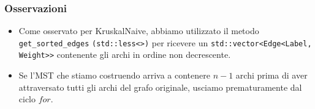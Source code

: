 \subsubsection{Osservazioni}
\begin{itemize}
    \item Come osservato per KruskalNaive, abbiamo utilizzato il metodo  \texttt{get_sorted_edges} \texttt{(std::less<>{})} per ricevere un \texttt{std::vector<Edge<Label, Weight>>} contenente gli archi in ordine non decrescente. \\

    \item Se l'MST che stiamo costruendo arriva a contenere $n - 1$ archi prima di aver attraversato tutti gli archi del grafo originale, usciamo prematuramente dal ciclo $for$. \\

\end{itemize}


